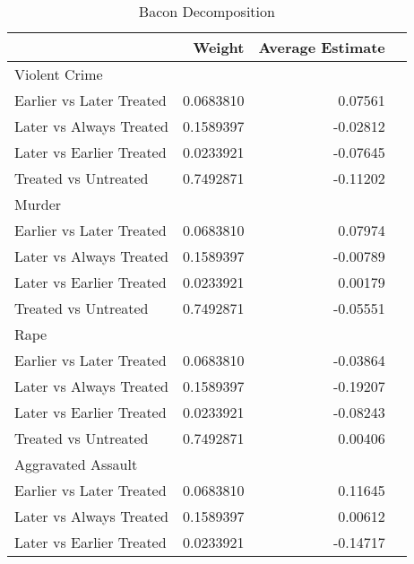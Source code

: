 \documentclass{article}
\begin{document}
\begin{table}[H]
\caption{Bacon Decomposition}
\centering
\label{tab:bacon}
\begin{tabular}[t]{lrrl}
\toprule
& Weight & Average Estimate\\
\midrule
Violent Crime\\
\hspace{3mm}Earlier vs Later Treated & 0.0683810 & 0.07561\\
\hspace{3mm}Later vs Always Treated & 0.1589397 & -0.02812\\
\hspace{3mm}Later vs Earlier Treated & 0.0233921 & -0.07645\\
\hspace{3mm}Treated vs Untreated & 0.7492871 & -0.11202\\
\midrule
Murder\\
\hspace{3mm}Earlier vs Later Treated & 0.0683810 & 0.07974\\
\hspace{3mm}Later vs Always Treated & 0.1589397 & -0.00789\\
\hspace{3mm}Later vs Earlier Treated & 0.0233921 & 0.00179\\
\hspace{3mm}Treated vs Untreated & 0.7492871 & -0.05551\\
\midrule
Rape\\
\hspace{3mm}Earlier vs Later Treated & 0.0683810 & -0.03864\\
\hspace{3mm}Later vs Always Treated & 0.1589397 & -0.19207\\
\hspace{3mm}Later vs Earlier Treated & 0.0233921 & -0.08243\\
\hspace{3mm}Treated vs Untreated & 0.7492871 & 0.00406\\
\midrule
Aggravated Assault\\
\hspace{3mm}Earlier vs Later Treated & 0.0683810 & 0.11645\\
\hspace{3mm}Later vs Always Treated & 0.1589397 & 0.00612\\
\hspace{3mm}Later vs Earlier Treated & 0.0233921 & -0.14717\\

\end{tabular}
\end{table}
\end{document}

